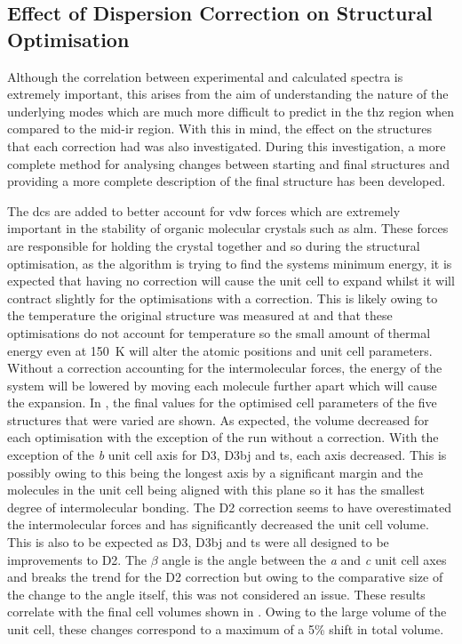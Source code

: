\subsection{Effect of Dispersion Correction on Structural Optimisation}
Although the correlation between experimental and calculated spectra is extremely important, this arises from the aim of understanding the nature of the underlying modes which are much more difficult to predict in the \acrshort{thz} region when compared to the mid\nobreakdash-\acrshort{ir} region. With this in mind, the effect on the structures that each correction had was also investigated. During this investigation, a more complete method for analysing changes between starting and final structures and providing a more complete description of the final structure has been developed.

The \acrshort{dc}s are added to better account for \acrfull{vdw} forces which are extremely important in the stability of organic molecular crystals such as \acrshort{alm}. These forces are responsible for holding the crystal together and so during the structural optimisation, as the algorithm is trying to find the systems minimum energy, it is expected that having no correction will cause the unit cell to expand whilst it will contract slightly for the optimisations with a correction. This is likely owing to the temperature the original structure was measured at and that these optimisations do not account for temperature so the small amount of thermal energy even at \SI{150}{K} will alter the atomic positions and unit cell parameters. Without a correction accounting for the intermolecular forces, the energy of the system will be lowered by moving each molecule further apart which will cause the expansion. In , the final values for the optimised cell parameters of the five structures that were varied are shown. As expected, the volume decreased for each optimisation with the exception of the run without a correction. With the exception of the \textit{b} unit cell axis for D3, D3\acrshort{bj} and \acrshort{ts}, each axis decreased. This is possibly owing to this being the longest axis by a significant margin and the molecules in the unit cell being aligned with this plane so it has the smallest degree of intermolecular bonding. The D2 correction seems to have overestimated the intermolecular forces and has significantly decreased the unit cell volume. This is also to be expected as D3, D3\acrshort{bj} and \acrshort{ts} were all designed to be improvements to D2. The \(\beta\) angle is the angle between the \textit{a} and \textit{c} unit cell axes and breaks the trend for the D2 correction but owing to the comparative size of the change to the angle itself, this was not considered an issue. These results correlate with the final cell volumes shown in . Owing to the large volume of the unit cell, these changes correspond to a maximum of a 5\% shift in total volume.

